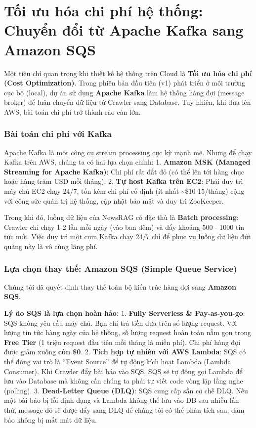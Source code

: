 \hypertarget{tux1ed1i-ux1b0u-huxf3a-chi-phuxed-hux1ec7-thux1ed1ng-chuyux1ec3n-ux111ux1ed5i-tux1eeb-apache-kafka-sang-amazon-sqs}{%
\section{Tối ưu hóa chi phí hệ thống: Chuyển đổi từ Apache Kafka sang
Amazon
SQS}}

Một tiêu chí quan trọng khi thiết kế hệ thống trên Cloud là \textbf{Tối
ưu hóa chi phí (Cost Optimization)}. Trong phiên bản đầu tiên (v1) phát
triển ở môi trường cục bộ (local), dự án sử dụng \textbf{Apache Kafka}
làm hệ thống hàng đợi (message broker) để luân chuyển dữ liệu từ Crawler
sang Database. Tuy nhiên, khi đưa lên AWS, bài toán chi phí trở thành
rào cản lớn.

\hypertarget{buxe0i-touxe1n-chi-phuxed-vux1edbi-kafka}{%
\subsubsection{Bài toán chi phí với
Kafka}}

Apache Kafka là một công cụ stream processing cực kỳ mạnh mẽ. Nhưng để
chạy Kafka trên AWS, chúng ta có hai lựa chọn chính: 1. \textbf{Amazon
MSK (Managed Streaming for Apache Kafka)}: Chi phí rất đắt đỏ (có thể
lên tới hàng chục hoặc hàng trăm USD mỗi tháng). 2. \textbf{Tự host
Kafka trên EC2}: Phải duy trì máy chủ EC2 chạy 24/7, tốn kém chi phí cố
định (ít nhất \textasciitilde\$10-15/tháng) cộng với công sức quản trị
hệ thống, cập nhật bảo mật và duy trì ZooKeeper.

Trong khi đó, luồng dữ liệu của NewsRAG có đặc thù là \textbf{Batch
processing}: Crawler chỉ chạy 1-2 lần mỗi ngày (vào ban đêm) và đẩy
khoảng 500 - 1000 tin tức mới. Việc duy trì một cụm Kafka chạy 24/7 chỉ
để phục vụ luồng dữ liệu đứt quãng này là vô cùng lãng phí.

\hypertarget{lux1ef1a-chux1ecdn-thay-thux1ebf-amazon-sqs-simple-queue-service}{%
\subsubsection{Lựa chọn thay thế: Amazon SQS (Simple Queue
Service)}}

Chúng tôi đã quyết định thay thế toàn bộ kiến trúc hàng đợi sang
\textbf{Amazon SQS}.

\textbf{Lý do SQS là lựa chọn hoàn hảo:} 1. \textbf{Fully Serverless \&
Pay-as-you-go}: SQS không yêu cầu máy chủ. Bạn chỉ trả tiền dựa trên số
lượng request. Với lượng tin tức hàng ngày của hệ thống, số lượng
request hoàn toàn nằm gọn trong \textbf{Free Tier} (1 triệu request đầu
tiên mỗi tháng là miễn phí). Chi phí hàng đợi được giảm xuống
\textbf{còn \$0}. 2. \textbf{Tích hợp tự nhiên với AWS Lambda}: SQS có
thể đóng vai trò là ``Event Source'' để tự động kích hoạt Lambda (Lambda
Consumer). Khi Crawler đẩy bài báo vào SQS, SQS sẽ tự động gọi Lambda để
lưu vào Database mà không cần chúng ta phải tự viết code vòng lặp lắng
nghe (polling). 3. \textbf{Dead-Letter Queue (DLQ)}: SQS cung cấp sẵn cơ
chế DLQ. Nếu một bài báo bị lỗi định dạng và Lambda không thể lưu vào DB
sau nhiều lần thử, message đó sẽ được đẩy sang DLQ để chúng tôi có thể
phân tích sau, đảm bảo không bị mất mát dữ liệu.

